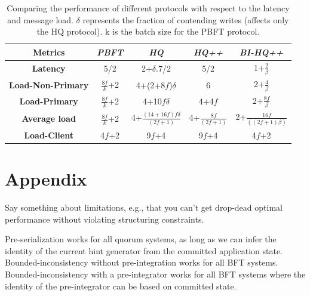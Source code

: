 \documentclass[twocolumn,10pt]{article}
\begin{document}
\begin{table}
\centering
\begin{tabular}{|c|c|c|c|c|}
\hline
\small{Metrics}& \textit{\small{PBFT}} & \textit{\small{HQ}} & \textit{\small{HQ++}} & \textit{\small{BI-HQ++}}\\
\hline
\hline
\textbf{\small{Latency}} & 5/2 & 2+$\delta$.7/2 & 5/2 &  1+$\frac{2}{\beta}$ \\
\hline
\textbf{\small{Load-Non-Primary}} & $\frac{8f}{k}$+2 & 4+(2+8$f$)$\delta$ & 6 & 2+$\frac{4}{\beta}$ \\
\hline
\textbf{\small{Load-Primary}} & $\frac{8f}{k}$+2 & 4+10$f\delta$ & 4+4$f$ & 2+$\frac{8f}{\beta}$\\
\hline
\textbf{\small{Average load}} & $\frac{8f}{k}$+2 & 4+$\frac{(14+16f)f\delta}{(2f+1)}$ & 4+$\frac{8f}{(2f+1)}$ &  2+$\frac{16f}{((2f+1)\beta)}$ \\
\hline
\textbf{\small{Load-Client}}& 4$f$+2& 9$f$+4& 9$f$+4 & 4$f$+2\\
\hline
\end{tabular}
\caption{Comparing the performance of different protocols with respect to the latency and message load.
 $\delta$ represents the fraction of contending writes (affects only the HQ protocol). k is the batch size for the PBFT protocol. }
\label{tab:overhead_est}
\end{table}

\fi



\section{Appendix}

 Say something about limitations, e.g., that you
can't get drop-dead optimal performance without violating structuring
constraints.

 Pre-serialization works for all quorum
systems, as long as we can infer the identity of the current
hint generator from the committed application state.
Bounded-inconsistency without pre-integration works for all BFT
systems.  Bounded-inconsistency with a pre-integrator works for all BFT
systems where the identity of the pre-integrator can be based on
committed state.
\end{document}
